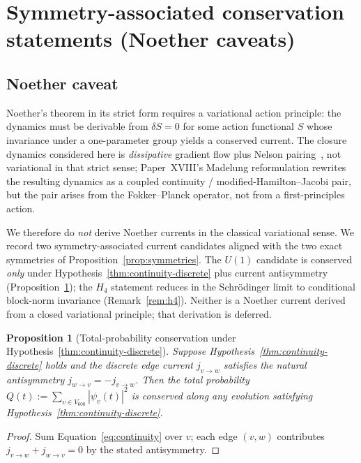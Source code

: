 \documentclass[11pt]{article}
\newtheorem{proposition}[theorem]{Proposition}
\theoremstyle{definition}
\begin{document}
\section{Symmetry-associated conservation statements (Noether caveats)}\label{sec:noether}

\subsection{Noether caveat}\label{sec:noether-caveat}

Noether's theorem in its strict form requires a variational action principle: the dynamics must be derivable from $\delta S = 0$ for some action functional $S$ whose invariance under a one-parameter group yields a conserved current. The closure dynamics considered here is \emph{dissipative} gradient flow plus Nelson pairing~\citep{SmartXII, SmartXVIII}, not variational in that strict sense; Paper~XVIII's Madelung reformulation rewrites the resulting dynamics as a coupled continuity / modified-Hamilton--Jacobi pair, but the pair arises from the Fokker--Planck operator, not from a first-principles action.

We therefore do \emph{not} derive Noether currents in the classical variational sense. We record two symmetry-associated current candidates aligned with the two exact symmetries of Proposition~\ref{prop:symmetries}. The $U(1)$ candidate is conserved \emph{only} under Hypothesis~\ref{thm:continuity-discrete} plus current antisymmetry (Proposition~\ref{thm:u1}); the $H_4$ statement reduces in the Schr\"{o}dinger limit to conditional block-norm invariance (Remark~\ref{rem:h4}). Neither is a Noether current derived from a closed variational principle; that derivation is deferred.

\begin{proposition}[Total-probability conservation under Hypothesis~\ref{thm:continuity-discrete}]\label{thm:u1}
Suppose Hypothesis~\ref{thm:continuity-discrete} holds and the discrete edge current $j_{v \to w}$ satisfies the natural antisymmetry $j_{w \to v} = -j_{v \to w}$. Then the total probability $Q(t) := \sum_{v \in V_{600}} |\psi_v(t)|^2$ is conserved along any evolution satisfying Hypothesis~\ref{thm:continuity-discrete}.
\end{proposition}

\begin{proof}
Sum Equation~\eqref{eq:continuity} over $v$; each edge $(v, w)$ contributes $j_{v \to w} + j_{w \to v} = 0$ by the stated antisymmetry.
\end{proof}
\end{document}
